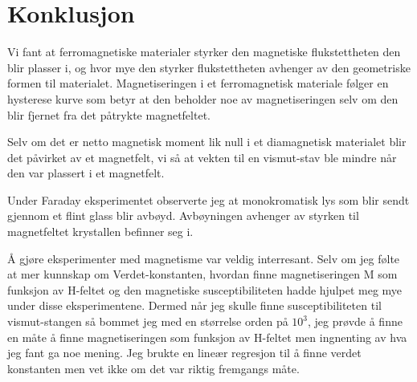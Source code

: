 \documentclass[norsk,a4paper,12pt]{article}
\begin{document}
\section{Konklusjon}

Vi fant at ferromagnetiske materialer styrker den magnetiske flukstettheten den blir plasser i, og hvor mye den styrker flukstettheten avhenger av den geometriske formen til materialet. Magnetiseringen i et ferromagnetisk materiale følger en hysterese kurve som betyr at den beholder noe av magnetiseringen selv om den blir fjernet fra det påtrykte magnetfeltet.

Selv om det er netto magnetisk moment lik null i et diamagnetisk materialet blir det påvirket av et magnetfelt, vi så at vekten til en vismut-stav ble mindre når den var plassert i et magnetfelt. 

Under Faraday eksperimentet observerte jeg at monokromatisk lys som blir sendt gjennom et flint glass blir avbøyd. Avbøyningen avhenger av styrken til magnetfeltet krystallen befinner seg i. 

Å gjøre eksperimenter med magnetisme var veldig interresant. Selv om jeg følte at mer kunnskap om Verdet-konstanten, hvordan finne magnetiseringen M som funksjon av H-feltet og den magnetiske susceptibiliteten hadde hjulpet meg mye under disse eksperimentene. 
Dermed når jeg skulle finne susceptibiliteten til vismut-stangen så bommet jeg med en størrelse orden på $10^3$, jeg prøvde å finne en måte å finne magnetiseringen som funksjon av H-feltet men ingnenting av hva jeg fant ga noe mening. Jeg brukte en lineær regresjon til å finne verdet konstanten men vet ikke om det var riktig fremgangs måte.
\end{document}
